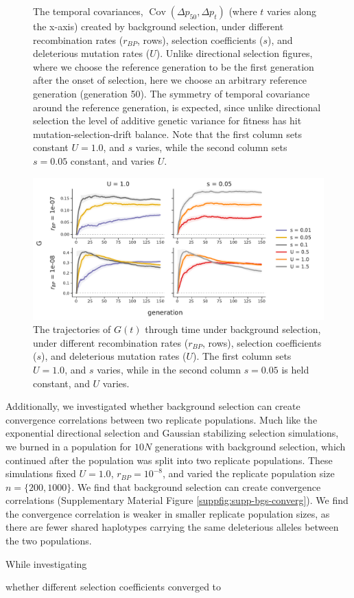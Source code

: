 \documentclass[11pt]{article}
\DeclareMathOperator{\cov}{Cov}
\begin{document}
{\begin{figure}[!ht]
  \caption{The temporal covariances, $\cov(\Delta p_{50}, \Delta p_t)$ (where
    $t$ varies along the x-axis) created by background selection, under
    different recombination rates ($r_{BP}$, rows), selection coefficients
    ($s$), and deleterious mutation rates ($U$). Unlike directional selection
    figures, where we choose the reference generation to be the first
    generation after the onset of selection, here we choose an arbitrary
    reference generation (generation 50). The symmetry of temporal covariance
    around the reference generation, is expected, since unlike directional
    selection the level of additive genetic variance for fitness has hit
    mutation-selection-drift balance. Note that the first column sets constant
  $U = 1.0$, and $s$ varies, while the second column sets $s=0.05$ constant,
and varies $U$.}

  \label{suppfig:supp-bgs-covs}
\end{figure}



\begin{figure}[!ht]
  \centering
  \includegraphics[width=\textwidth]{figures/fig-bgs-G-without-fixations.pdf}

  \caption{The trajectories of $G(t)$ through time under background selection,
    under different recombination rates ($r_{BP}$, rows), selection
    coefficients ($s$), and deleterious mutation rates ($U$). The first column
    sets $U = 1.0$, and $s$ varies, while in the second column $s=0.05$ is held
  constant, and $U$ varies.}

  \label{suppfig:supp-bgs-g}
\end{figure}

Additionally, we investigated whether background selection can create
convergence correlations between two replicate populations. Much like the
exponential directional selection and Gaussian stabilizing selection
simulations, we burned in a population for $10N$ generations with background
selection, which continued after the population was split into two replicate
populations. These simulations fixed $U = 1.0$, $r_{BP} = 10^{-8}$, and varied
the replicate population size $n = \{200, 1000\}$. We find that background
selection can create convergence correlations (Supplementary Material Figure
\ref{suppfig:supp-bgs-converg}). We find the convergence correlation is weaker
in smaller replicate population sizes, as there are fewer shared haplotypes
carrying the same deleterious alleles between the two populations.

While investigating} whether different selection coefficients converged to
\end{document}
